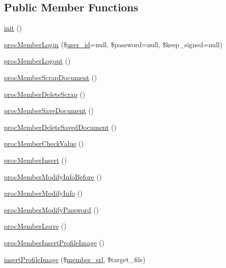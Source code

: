 \subsection*{Public Member Functions}
\begin{DoxyCompactItemize}
\item 
\hyperlink{classmemberController_a1de8a45f3b986e23bbf60d685f8d779d}{init} ()
\item 
\hyperlink{classmemberController_a1e37a85198193c84a66b4472a677960d}{proc\-Member\-Login} (\$\hyperlink{ko_8install_8php_a74f1a394389d774e5b4cd5d1d15413f7}{user\-\_\-id}=null, \$password=null, \$keep\-\_\-signed=null)
\item 
\hyperlink{classmemberController_a9b27cafc18ca21df327c49842987c829}{proc\-Member\-Logout} ()
\item 
\hyperlink{classmemberController_a7c582f99e2bda6a956a7a2a33a01c6c6}{proc\-Member\-Scrap\-Document} ()
\item 
\hyperlink{classmemberController_ae1eb0a3ef4da18d06c4fce0dc4fbbe24}{proc\-Member\-Delete\-Scrap} ()
\item 
\hyperlink{classmemberController_abe77500da26f14cd629ca373f94e04d1}{proc\-Member\-Save\-Document} ()
\item 
\hyperlink{classmemberController_a4e154a138901b9b941f9949576c47f00}{proc\-Member\-Delete\-Saved\-Document} ()
\item 
\hyperlink{classmemberController_ac9e9ed09b49a295c94a4c3bad239757f}{proc\-Member\-Check\-Value} ()
\item 
\hyperlink{classmemberController_a8f176054f72833b01e2229108da0b599}{proc\-Member\-Insert} ()
\item 
\hyperlink{classmemberController_ac7a79ff38569abb383495b4d796eba69}{proc\-Member\-Modify\-Info\-Before} ()
\item 
\hyperlink{classmemberController_abe0dc1c6680e07a0189e53a10a7651f2}{proc\-Member\-Modify\-Info} ()
\item 
\hyperlink{classmemberController_ae62edfe1a880c94c02fba4c04b22add3}{proc\-Member\-Modify\-Password} ()
\item 
\hyperlink{classmemberController_a4c78a9114c62d27178d70bb4b8d19455}{proc\-Member\-Leave} ()
\item 
\hyperlink{classmemberController_ac8b43955581e87f21c77ee741f633a66}{proc\-Member\-Insert\-Profile\-Image} ()
\item 
\hyperlink{classmemberController_af7334a64b7530387a5f761935d042933}{insert\-Profile\-Image} (\$\hyperlink{ko_8install_8php_aa61f9e08f0fe505094d26f8143f30bbd}{member\-\_\-srl}, \$target\-\_\-file)

\end{DoxyCompactItemize}
